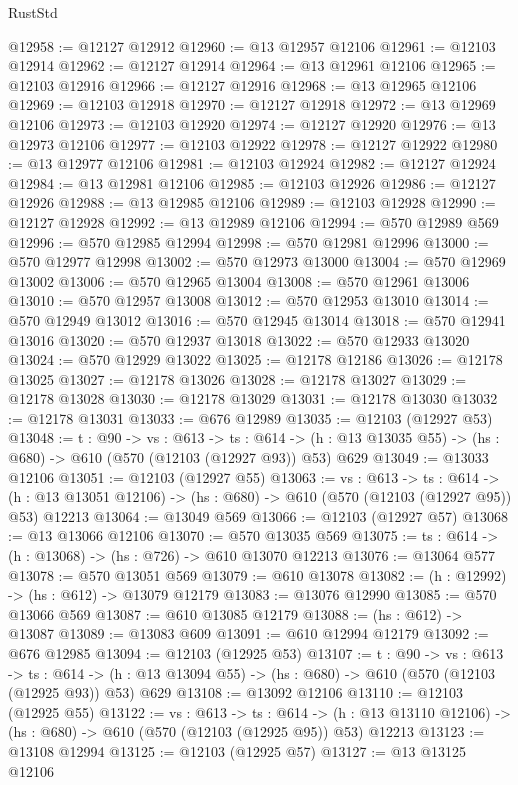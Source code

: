 \begin{lexlean}{RustStd}
\begin{coremodule}
@12958 := @12127 @12912
@12960 := @13 @12957 @12106
@12961 := @12103 @12914
@12962 := @12127 @12914
@12964 := @13 @12961 @12106
@12965 := @12103 @12916
@12966 := @12127 @12916
@12968 := @13 @12965 @12106
@12969 := @12103 @12918
@12970 := @12127 @12918
@12972 := @13 @12969 @12106
@12973 := @12103 @12920
@12974 := @12127 @12920
@12976 := @13 @12973 @12106
@12977 := @12103 @12922
@12978 := @12127 @12922
@12980 := @13 @12977 @12106
@12981 := @12103 @12924
@12982 := @12127 @12924
@12984 := @13 @12981 @12106
@12985 := @12103 @12926
@12986 := @12127 @12926
@12988 := @13 @12985 @12106
@12989 := @12103 @12928
@12990 := @12127 @12928
@12992 := @13 @12989 @12106
@12994 := @570 @12989 @569
@12996 := @570 @12985 @12994
@12998 := @570 @12981 @12996
@13000 := @570 @12977 @12998
@13002 := @570 @12973 @13000
@13004 := @570 @12969 @13002
@13006 := @570 @12965 @13004
@13008 := @570 @12961 @13006
@13010 := @570 @12957 @13008
@13012 := @570 @12953 @13010
@13014 := @570 @12949 @13012
@13016 := @570 @12945 @13014
@13018 := @570 @12941 @13016
@13020 := @570 @12937 @13018
@13022 := @570 @12933 @13020
@13024 := @570 @12929 @13022
@13025 := @12178 @12186
@13026 := @12178 @13025
@13027 := @12178 @13026
@13028 := @12178 @13027
@13029 := @12178 @13028
@13030 := @12178 @13029
@13031 := @12178 @13030
@13032 := @12178 @13031
@13033 := @676 @12989
@13035 := @12103 (@12927 @53)
@13048 := {t : @90} ->
  {vs : @613} ->
  {ts : @614} -> (h : @13 @13035 @55) -> (hs : @680) -> @610 (@570 (@12103 (@12927 @93)) @53) @629
@13049 := @13033 @12106
@13051 := @12103 (@12927 @55)
@13063 := {vs : @613} ->
  {ts : @614} ->
  (h : @13 @13051 @12106) -> (hs : @680) -> @610 (@570 (@12103 (@12927 @95)) @53) @12213
@13064 := @13049 @569
@13066 := @12103 (@12927 @57)
@13068 := @13 @13066 @12106
@13070 := @570 @13035 @569
@13075 := {ts : @614} -> (h : @13068) -> (hs : @726) -> @610 @13070 @12213
@13076 := @13064 @577
@13078 := @570 @13051 @569
@13079 := @610 @13078
@13082 := (h : @12992) -> (hs : @612) -> @13079 @12179
@13083 := @13076 @12990
@13085 := @570 @13066 @569
@13087 := @610 @13085 @12179
@13088 := (hs : @612) -> @13087
@13089 := @13083 @609
@13091 := @610 @12994 @12179
@13092 := @676 @12985
@13094 := @12103 (@12925 @53)
@13107 := {t : @90} ->
  {vs : @613} ->
  {ts : @614} -> (h : @13 @13094 @55) -> (hs : @680) -> @610 (@570 (@12103 (@12925 @93)) @53) @629
@13108 := @13092 @12106
@13110 := @12103 (@12925 @55)
@13122 := {vs : @613} ->
  {ts : @614} ->
  (h : @13 @13110 @12106) -> (hs : @680) -> @610 (@570 (@12103 (@12925 @95)) @53) @12213
@13123 := @13108 @12994
@13125 := @12103 (@12925 @57)
@13127 := @13 @13125 @12106

\end{coremodule}
\end{lexlean}
